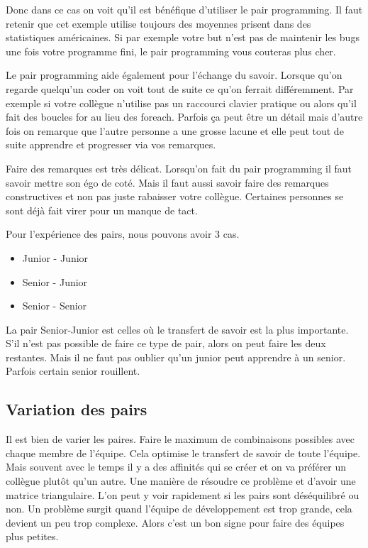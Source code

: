 \documentclass[journal, a4paper, frenchb]{IEEEtran}
\begin{document}
Donc dans ce cas on voit qu’il est bénéfique d’utiliser le pair programming. Il faut retenir que cet
exemple utilise toujours des moyennes prisent dans des statistiques américaines. Si par exemple
votre but n’est pas de maintenir les bugs une fois votre programme fini, le pair programming vous
couteras plus cher.

Le pair programming aide également pour l’échange du savoir. Lorsque qu’on regarde quelqu’un
coder on voit tout de suite ce qu’on ferrait différemment. Par exemple si votre collègue n’utilise pas
un raccourci clavier pratique ou alors qu’il fait des boucles for au lieu des foreach. Parfois ça peut
être un détail mais d’autre fois on remarque que l’autre personne a une grosse lacune et elle peut
tout de suite apprendre et progresser via vos remarques.

Faire des remarques est très délicat. Lorsqu’on fait du pair programming il faut savoir mettre son égo
de coté. Mais il faut aussi savoir faire des remarques constructives et non pas juste rabaisser votre
collègue. Certaines personnes se sont déjà fait virer pour un manque de tact.

Pour l’expérience des pairs, nous pouvons avoir 3 cas.

\begin{itemize}
  \item Junior - Junior
  \item Senior - Junior
  \item Senior - Senior
\end{itemize}

La pair Senior-Junior est celles où le transfert de savoir est la plus importante. S’il n’est pas possible
de faire ce type de pair, alors on peut faire les deux restantes. Mais il ne faut pas oublier qu’un junior
peut apprendre à un senior. Parfois certain senior rouillent.

\subsection{Variation des pairs}

Il est bien de varier les paires. Faire le maximum de combinaisons possibles avec chaque membre de
l’équipe. Cela optimise le transfert de savoir de toute l’équipe. Mais souvent avec le temps il y a des
affinités qui se créer et on va préférer un collègue plutôt qu’un autre. Une manière de résoudre ce
problème et d’avoir une matrice triangulaire. L’on peut y voir rapidement si les pairs sont
déséquilibré ou non. Un problème surgit quand l’équipe de développement est trop grande, cela
devient un peu trop complexe. Alors c’est un bon signe pour faire des équipes plus petites.
\end{document}
